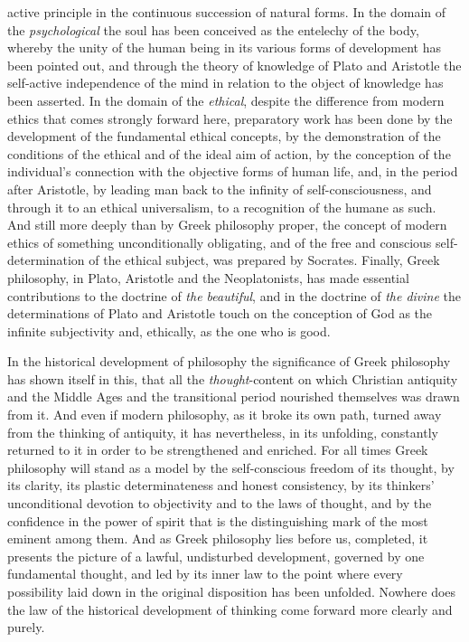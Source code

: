 active principle in the continuous succession of natural forms. In the
domain of the \emph{psychological} the soul has been conceived as the
entelechy of the body, whereby the unity of the human being in its
various forms of development has been pointed out, and through the
theory of knowledge of Plato and Aristotle the self-active independence
of the mind in relation to the object of knowledge has been asserted.
In the domain of the \emph{ethical}, despite the difference from modern
ethics that comes strongly forward here, preparatory work has been done
by the development of the fundamental ethical concepts, by the
demonstration of the conditions of the ethical and of the ideal aim of
action, by the conception of the individual's connection with the
objective forms of human life, and, in the period after Aristotle, by
leading man back to the infinity of self-consciousness, and through it
to an ethical universalism, to a recognition of the humane as such. And
still more deeply than by Greek philosophy proper, the concept of modern
ethics of something unconditionally obligating, and of the free and
conscious self-determination of the ethical subject, was prepared by
Socrates. Finally, Greek philosophy, in Plato, Aristotle and the
Neoplatonists, has made essential contributions to the doctrine of
\emph{the beautiful}, and in the doctrine of \emph{the divine} the
determinations of Plato and Aristotle touch on the conception of God as
the infinite subjectivity and, ethically, as the one who is good.

In the historical development of philosophy the significance of Greek
philosophy has shown itself in this, that all the \emph{thought}-content
on which Christian antiquity and the Middle Ages and the transitional
period nourished themselves was drawn from it. And even if modern
philosophy, as it broke its own path, turned away from the thinking of
antiquity, it has nevertheless, in its unfolding, constantly returned to
it in order to be strengthened and enriched. For all times Greek
philosophy will stand as a model by the self-conscious freedom of its
thought, by its clarity, its plastic determinateness and honest
consistency, by its thinkers' unconditional devotion to objectivity and
to the laws of thought, and by the
confidence in the power of spirit that is the distinguishing
mark of the most eminent among them. And as Greek philosophy lies before
us, completed, it presents the picture of a lawful, undisturbed
development, governed by one fundamental thought, and led by its inner
law to the point where every possibility laid down in the original
disposition has been unfolded. Nowhere does the law of the historical
development of thinking come forward more clearly and purely.

